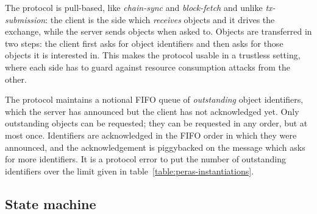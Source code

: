 The protocol is pull-based, like \textit{chain-sync} and \textit{block-fetch}
and unlike \textit{tx-submission}: the client is the side which
\textit{receives} objects and it drives the exchange, while the server sends
objects when asked to.  Objects are transferred in two steps: the client first
asks for object identifiers and then asks for those objects it is interested
in.  This makes the protocol usable in a trustless setting, where each side has
to guard against resource consumption attacks from the other.

The protocol maintains a notional FIFO queue of \textit{outstanding} object
identifiers, which the server has announced but the client has not acknowledged
yet.  Only outstanding objects can be requested; they can be requested in any
order, but at most once.  Identifiers are acknowledged in the FIFO order in
which they were announced, and the acknowledgement is piggybacked on the
message which asks for more identifiers.  It is a protocol error to put the
number of outstanding identifiers over the limit given in
table~\ref{table:peras-instantiations}.

\newcommand{\StObjectIdsB}      {\state{StObjectIdsBlocking}}
\newcommand{\StObjectIdsNB}     {\state{StObjectIdsNonBlocking}}
\newcommand{\StObjects}         {\state{StObjects}}
\newcommand{\MsgRequestObjIdsB} {\msg{MsgRequestObjectIdsBlocking}}
\newcommand{\MsgRequestObjIdsNB}{\msg{MsgRequestObjectIdsNonBlocking}}
\newcommand{\MsgReplyObjectIds} {\msg{MsgReplyObjectIds}}
\newcommand{\MsgRequestObjects} {\msg{MsgRequestObjects}}
\newcommand{\MsgReplyObjects}   {\msg{MsgReplyObjects}}

\subsection{State machine}

